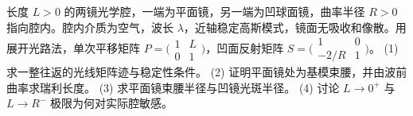 长度 \(L>0\) 的两镜光学腔，一端为平面镜，另一端为凹球面镜，曲率半径 \(R>0\) 指向腔内。腔内介质为空气，波长 \(\lambda\)，近轴稳定高斯模式，镜面无吸收和像散。用展开光路法，单次平移矩阵 \(P=\bigl(\begin{smallmatrix}1&L\\0&1\end{smallmatrix}\bigr)\)，凹面反射矩阵 \(S=\bigl(\begin{smallmatrix}1&0\\-2/R&1\end{smallmatrix}\bigr)\)。
(1) 求一整往返的光线矩阵迹与稳定性条件。
(2) 证明平面镜处为基模束腰，并由波前曲率求瑞利长度。
(3) 求平面镜束腰半径与凹镜光斑半径。
(4) 讨论 \(L\to0^+\) 与 \(L\to R^-\) 极限为何对实际腔敏感。
